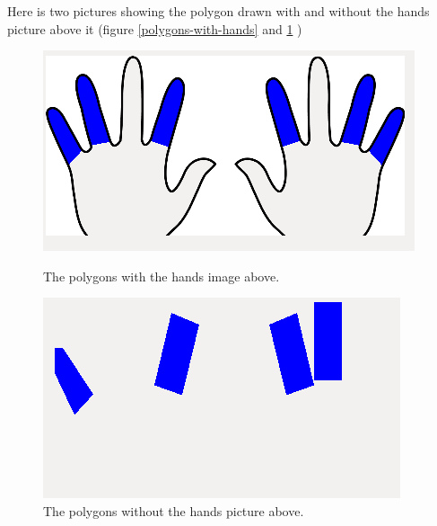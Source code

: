 Here is two pictures showing the polygon drawn with and without the hands picture above it (figure \ref{polygons-with-hands}  and \ref{polygons-without-hands} )
\begin{figure}[H]
  \centering
  \begin{minipage}[b]{0.45\textwidth}
    \includegraphics[width=\textwidth]{images/with-hands.png}
    \caption{The polygons with the hands image above.}
    \label{polygons-with-hands}
  \end{minipage}
  \hfill
  \begin{minipage}[b]{0.45\textwidth}
    \includegraphics[width=\textwidth]{images/without-hands.png}
    \caption{The polygons without the hands picture above.}
    \label{polygons-without-hands}
  \end{minipage}
\end{figure}


